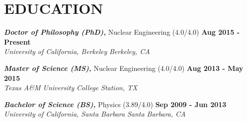 \section{\small{EDUCATION}}

{\sl\bf Doctor of Philosophy (PhD),} Nuclear Engineering (4.0/4.0) \hfill {\bf Aug 2015 - Present} \\
{\sl University of California, Berkeley} \hfill {\sl Berkeley, CA}
\vspace{-5pt}

{\sl\bf Master of Science (MS),} Nuclear Engineering (4.0/4.0) \hfill {\bf Aug 2013 - May 2015} \\
{\sl Texas A\&M University} \hfill {\sl College Station, TX}
\vspace{-5pt}

{\sl\bf Bachelor of Science (BS),} Physics (3.89/4.0) \hfill {\bf Sep 2009 - Jun 2013} \\
{\sl University of California, Santa Barbara} \hfill {\sl Santa Barbara, CA}
